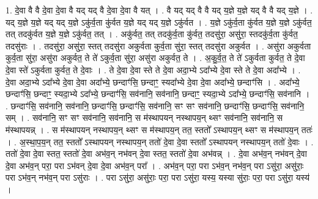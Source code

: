 \documentclass[17pt]{extarticle}
\begin{document}
1. दे॒वा वै वै दे॒वा दे॒वा वै यद् यद् वै दे॒वा दे॒वा वै यत् । . वै यद् यद् वै वै यद् य॒ज्ञे य॒ज्ञे यद् वै वै यद् य॒ज्ञे । . यद् य॒ज्ञे य॒ज्ञे यद् यद् य॒ज्ञे ऽकु॑र्व॒ता कु॑र्वत य॒ज्ञे यद् यद् य॒ज्ञे ऽकु॑र्वत । . य॒ज्ञे ऽकु॑र्व॒ता कु॑र्वत य॒ज्ञे य॒ज्ञे ऽकु॑र्वत॒ तत् तदकु॑र्वत य॒ज्ञे य॒ज्ञे ऽकु॑र्वत॒ तत् । . अकु॑र्वत॒ तत् तदकु॑र्व॒ता कु॑र्वत॒ तदसु॑रा॒ असु॑रा॒ स्तदकु॑र्व॒ता कु॑र्वत॒ तदसु॑राः । . तदसु॑रा॒ असु॑रा॒ स्तत् तदसु॑रा अकुर्वता कुर्व॒ता सु॑रा॒ स्तत् तदसु॑रा अकुर्वत । . असु॑रा अकुर्वता कुर्व॒ता सु॑रा॒ असु॑रा अकुर्वत॒ ते ते॑ ऽकुर्व॒ता सु॑रा॒ असु॑रा अकुर्वत॒ ते । . अ॒कु॒र्व॒त॒ ते ते॑ ऽकुर्वता कुर्वत॒ ते दे॒वा दे॒वा स्ते॑ ऽकुर्वता कुर्वत॒ ते दे॒वाः । . ते दे॒वा दे॒वा स्ते ते दे॒वा अदा॒भ्ये ऽदा᳚भ्ये दे॒वा स्ते ते दे॒वा अदा᳚भ्ये । . दे॒वा अदा॒भ्ये ऽदा᳚भ्ये दे॒वा दे॒वा अदा᳚भ्ये॒ छन्दाꣳ॑सि॒ छन्दाꣳ॒॒ स्यदा᳚भ्ये दे॒वा दे॒वा अदा᳚भ्ये॒ छन्दाꣳ॑सि । . अदा᳚भ्ये॒ छन्दाꣳ॑सि॒ छन्दाꣳ॒॒ स्यदा॒भ्ये ऽदा᳚भ्ये॒ छन्दाꣳ॑सि॒ सव॑नानि॒ सव॑नानि॒ छन्दाꣳ॒॒ स्यदा॒भ्ये ऽदा᳚भ्ये॒ छन्दाꣳ॑सि॒ सव॑नानि । . छन्दाꣳ॑सि॒ सव॑नानि॒ सव॑नानि॒ छन्दाꣳ॑सि॒ छन्दाꣳ॑सि॒ सव॑नानि॒ सꣳ सꣳ सव॑नानि॒ छन्दाꣳ॑सि॒ छन्दाꣳ॑सि॒ सव॑नानि॒ सम् । . सव॑नानि॒ सꣳ सꣳ सव॑नानि॒ सव॑नानि॒ स म॑स्थापयन् नस्थापय॒न् थ्सꣳ सव॑नानि॒ सव॑नानि॒ स म॑स्थापयन्न् । . स म॑स्थापयन् नस्थापय॒न् थ्सꣳ स म॑स्थापय॒न् तत॒ स्ततो᳚ ऽस्थापय॒न् थ्सꣳ स म॑स्थापय॒न् ततः॑ । . अ॒स्था॒प॒य॒न् तत॒ स्ततो᳚ ऽस्थापयन् नस्थापय॒न् ततो॑ दे॒वा दे॒वा स्ततो᳚ ऽस्थापयन् नस्थापय॒न् ततो॑ दे॒वाः । . ततो॑ दे॒वा दे॒वा स्तत॒ स्ततो॑ दे॒वा अभ॑व॒न् नभ॑वन् दे॒वा स्तत॒ स्ततो॑ दे॒वा अभ॑वन्न् । . दे॒वा अभ॑व॒न् नभ॑वन् दे॒वा दे॒वा अभ॑व॒न् परा॒ परा ऽभ॑वन् दे॒वा दे॒वा अभ॑व॒न् परा᳚ । . अभ॑व॒न् परा॒ परा ऽभ॑व॒न् नभ॑व॒न् परा ऽसु॑रा॒ असु॑राः॒ परा ऽभ॑व॒न् नभ॑व॒न् परा ऽसु॑राः । . परा ऽसु॑रा॒ असु॑राः॒ परा॒ परा ऽसु॑रा॒ यस्य॒ यस्या सु॑राः॒ परा॒ परा ऽसु॑रा॒ यस्य॑ । \newline
\end{document}
